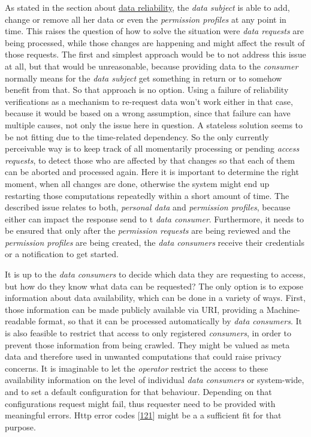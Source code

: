 \documentclass[12pt,english,a4paper,titlepage,cleardoublepage=empty,dottedtoc]{report}
\begin{document}
As stated in the section about \protect\hyperlink{data-reliability}{data
reliability}, the \emph{data subject} is able to add, change or remove
all her data or even the \emph{permission profiles} at any point in
time. This raises the question of how to solve the situation were
\emph{data requests} are being processed, while those changes are
happening and might affect the result of those requests. The first and
simplest approach would be to not address this issue at all, but that
would be unreasonable, because providing data to the \emph{consumer}
normally means for the \emph{data subject} get something in return or to
somehow benefit from that. So that approach is no option. Using a
failure of reliability verifications as a mechanism to re-request data
won't work either in that case, because it would be based on a wrong
assumption, since that failure can have multiple causes, not only the
issue here in question. A stateless solution seems to be not fitting due
to the time-related dependency. So the only currently perceivable way is
to keep track of all momentarily processing or pending \emph{access
requests}, to detect those who are affected by that changes so that each
of them can be aborted and processed again. Here it is important to
determine the right moment, when all changes are done, otherwise the
system might end up restarting those computations repeatedly within a
short amount of time. The described issue relates to both,
\emph{personal data} and \emph{permission profiles}, because either can
impact the response send to t \emph{data consumer}. Furthermore, it
needs to be ensured that only after the \emph{permission requests} are
being reviewed and the \emph{permission profiles} are being created, the
\emph{data consumers} receive their credentials or a notification to get
started.

It is up to the \emph{data consumers} to decide which data they are
requesting to access, but how do they know what data can be requested?
The only option is to expose information about data availability, which
can be done in a variety of ways. First, those information can be made
publicly available via URI, providing a Machine-readable format, so that
it can be processed automatically by \emph{data consumers}. It is also
feasible to restrict that access to only registered \emph{consumers}, in
order to prevent those information from being crawled. They might be
valued as meta data and therefore used in unwanted computations that
could raise privacy concerns. It is imaginable to let the
\emph{operator} restrict the access to these availability information on
the level of individual \emph{data consumers} or system-wide, and to set
a default configuration for that behaviour. Depending on that
configurations request might fail, thus requester need to be provided
with meaningful errors. Http error codes
{[}\protect\hyperlink{ref-web_spec_http-error-codes}{121}{]} might be a
a sufficient fit for that purpose.
\end{document}
